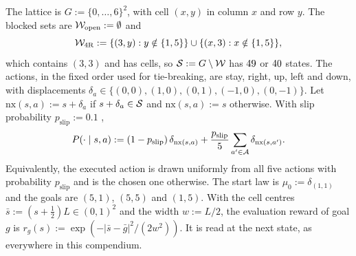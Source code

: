 \begin{definition}\label{def:env-finite}
The lattice is $G:=\{0,\dots,6\}^2$, with cell $(x,y)$ in column $x$ and row $y$.
The blocked sets are $\cW_{\mathrm{open}}:=\emptyset$ and
\[
\cW_{\mathrm{4R}}:=\{(3,y):y\notin\{1,5\}\}\cup\{(x,3):x\notin\{1,5\}\},
\]
which contains $(3,3)$ and has  cells, so $\cS:=G\setminus\cW$ has $\vn{env.cells.open}{49}$ or $\vn{env.cells.4r}{40}$ states.
The actions, in the fixed order used for tie-breaking, are stay, right, up, left and down, with displacements $\delta_a\in\{(0,0),(1,0),(0,1),(-1,0),(0,-1)\}$.
Let $\mathrm{nx}(s,a):=s+\delta_a$ if $s+\delta_a\in\cS$ and $\mathrm{nx}(s,a):=s$ otherwise.
With slip probability $p_{\mathrm{slip}}:=0.1$ ,
\begin{equation}\label{eq:env-finite-kernel}
P(\cdot\mid s,a):=(1-p_{\mathrm{slip}})\,\delta_{\mathrm{nx}(s,a)}+\frac{p_{\mathrm{slip}}}{5}\sum_{a'\in\cA}\delta_{\mathrm{nx}(s,a')} .
\end{equation}
Equivalently, the executed action is drawn uniformly from all five actions with probability $p_{\mathrm{slip}}$ and is the chosen one otherwise.
The start law is $\mu_0:=\delta_{(1,1)}$ and the goals are $(5,1)$, $(5,5)$ and $(1,5)$.
With the cell centres $\bar s:=(s+\frac12)L\in(0,1)^2$ and the width $w:=L/2$, the evaluation reward of goal $g$ is $r_g(s):=\exp(-\lvert\bar s-\bar g\rvert^2/(2w^2))$.
It is read at the next state, as everywhere in this compendium.
\end{definition}

